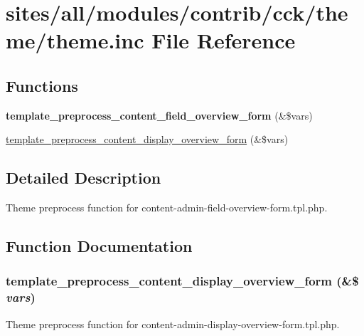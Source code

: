 \hypertarget{sites_2all_2modules_2contrib_2cck_2theme_2theme_8inc}{
\section{sites/all/modules/contrib/cck/theme/theme.inc File Reference}
\label{sites_2all_2modules_2contrib_2cck_2theme_2theme_8inc}
}
\subsection*{Functions}
\begin{CompactItemize}
\item 
\hypertarget{sites_2all_2modules_2contrib_2cck_2theme_2theme_8inc_94f733bc0bc3ab7fbddab408a5129560}{
\textbf{template\_\-preprocess\_\-content\_\-field\_\-overview\_\-form} (\&\$vars)}
\label{sites_2all_2modules_2contrib_2cck_2theme_2theme_8inc_94f733bc0bc3ab7fbddab408a5129560}

\item 
\hyperlink{sites_2all_2modules_2contrib_2cck_2theme_2theme_8inc_374556001571750561dc0183aaed70c6}{template\_\-preprocess\_\-content\_\-display\_\-overview\_\-form} (\&\$vars)
\end{CompactItemize}


\subsection{Detailed Description}
Theme preprocess function for content-admin-field-overview-form.tpl.php. 

\subsection{Function Documentation}
\hypertarget{sites_2all_2modules_2contrib_2cck_2theme_2theme_8inc_374556001571750561dc0183aaed70c6}{
\subsubsection[{template\_\-preprocess\_\-content\_\-display\_\-overview\_\-form}]{\setlength{\rightskip}{0pt plus 5cm}template\_\-preprocess\_\-content\_\-display\_\-overview\_\-form (\&\$ {\em vars})}}
\label{sites_2all_2modules_2contrib_2cck_2theme_2theme_8inc_374556001571750561dc0183aaed70c6}


Theme preprocess function for content-admin-display-overview-form.tpl.php. 